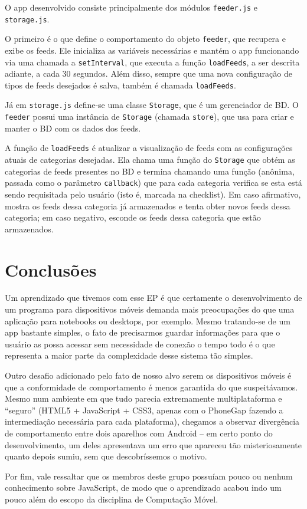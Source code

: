 \documentclass[brazil]{article}
\begin{document}
O app desenvolvido consiste principalmente dos módulos \texttt{feeder.js} e
\texttt{storage.js}.

O primeiro é o que define o comportamento do objeto \texttt{feeder}, que
recupera e exibe os feeds. Ele inicializa as variáveis necessárias e
mantém o app funcionando via uma chamada a
\texttt{setInterval}, que executa a função \texttt{loadFeeds}, a ser descrita
adiante, a cada 30
segundos. Além disso, sempre que uma nova configuração de tipos de feeds
desejados é salva, também é chamada \texttt{loadFeeds}.

Já em \texttt{storage.js} define-se uma classe \texttt{Storage}, que é um
gerenciador de BD. O \texttt{feeder} possui uma instância de \texttt{Storage}
(chamada \texttt{store}), que usa para criar e manter o BD com os dados dos
feeds.

A função de \texttt{loadFeeds} é atualizar a visualização de feeds com as
configurações atuais de categorias desejadas. Ela chama uma função do
\texttt{Storage} que obtém as categorias de feeds presentes no BD e termina
chamando uma função (anônima, passada como o parâmetro \texttt{callback}) que
para cada categoria verifica se esta está sendo requisitada pelo usuário
(isto é, marcada na checklist). Em caso afirmativo, mostra os feeds dessa
categoria já armazenados e tenta obter novos feeds dessa categoria; em caso
negativo, esconde os feeds dessa categoria que estão armazenados.


\section{Conclusões}
Um aprendizado que tivemos com esse EP é que certamente o desenvolvimento de
um programa para dispositivos móveis demanda mais preocupações do que uma
aplicação para notebooks ou desktops, por exemplo. Mesmo tratando-se de um
app bastante simples, o fato de precisarmos guardar informações para que o
usuário as possa acessar sem necessidade de conexão o tempo todo é o que
representa a maior parte da complexidade desse sistema tão simples.

Outro desafio adicionado pelo fato de nosso alvo serem os dispositivos móveis
é que a conformidade de comportamento é menos garantida do que suspeitávamos.
Mesmo num ambiente em que tudo parecia extremamente multiplataforma e
``seguro'' (HTML5 + JavaScript + CSS3, apenas com o PhoneGap fazendo a
intermediação necessária para cada plataforma), chegamos a observar divergência
de comportamento entre dois aparelhos com Android -- em certo ponto do
desenvolvimento, um deles apresentava
um erro que apareceu tão misteriosamente quanto depois sumiu, sem que
descobríssemos o motivo.

Por fim, vale ressaltar que os membros deste grupo possuíam pouco ou nenhum
conhecimento sobre JavaScript, de modo que o aprendizado acabou indo um pouco
além do escopo da disciplina de Computação Móvel.
\end{document}
